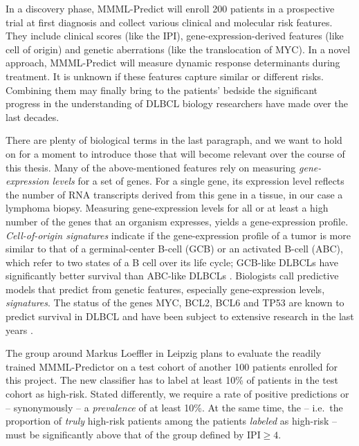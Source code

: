In a discovery phase, MMML-Predict will enroll \num{200} patients in a prospective trial at first 
diagnosis and collect various clinical and molecular risk features.
They include clinical scores (like the IPI), gene-expression-derived features (like cell of origin) 
and genetic aberrations (like the translocation of MYC). 
In a novel approach, MMML-Predict will measure dynamic response determinants during treatment. It is 
unknown if these features capture similar or different 
risks. Combining them may finally bring to the patients' bedside the significant progress in the 
understanding of DLBCL biology researchers have made over the last decades.

There are plenty of biological terms in the last paragraph, and we want to hold on for a moment to 
introduce those that will become relevant over the course of this thesis.
Many of the above-mentioned features rely on measuring \textit{gene-expression levels} for a set 
of genes. 
For a single gene, its expression level reflects the number of RNA transcripts derived from 
this gene in a tissue, in our case a lymphoma biopsy. Measuring gene-expression levels for all 
or at least a high number of the genes that an organism expresses, yields a gene-expression 
profile. \textit{Cell-of-origin signatures} indicate if the gene-expression profile 
of a tumor is more similar to that of a germinal-center B-cell (GCB) or an activated B-cell (ABC), 
which refer to two states of a B cell over its life cycle; GCB-like DLBCLs have 
significantly better survival than ABC-like DLBCLs \cite{abc-gcb00}.
Biologists call predictive models that 
predict from genetic features, especially gene-expression levels, \textit{signatures}. The status 
of the genes MYC, BCL2, BCL6 and TP53 are known to predict survival in DLBCL and have been subject 
to extensive research in the last years
\cite{aukema11, horn13, hummel06, johnson09, klapper08, kretzmer15, rosenwald19, zenz17}.

The group around Markus Loeffler in Leipzig plans to evaluate the readily trained MMML-Predictor on 
a test cohort of another \num{100} patients enrolled for this project. The new classifier has to 
label at least \num{10}\% of 
patients in the test cohort as high-risk. Stated differently, we require a rate of positive 
predictions or -- synonymously -- a \textit{prevalence} of at least \num{10}\%. At the same time, the 
 -- i.e.\ the proportion of \textit{truly} high-risk patients among the patients 
\textit{labeled} as high-risk -- must be significantly above that of the group defined by
$\text{IPI} \geq 4$. 


